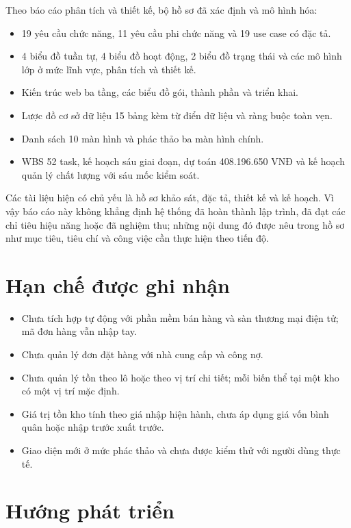 \documentclass[12pt,a4paper]{report}
\begin{document}
Theo báo cáo phân tích và thiết kế, bộ hồ sơ đã xác định và mô hình hóa:
\begin{itemize}
\item 19 yêu cầu chức năng, 11 yêu cầu phi chức năng và 19 use case có đặc tả.
\item 4 biểu đồ tuần tự, 4 biểu đồ hoạt động, 2 biểu đồ trạng thái và các mô hình lớp ở mức lĩnh vực, phân tích và thiết kế.
\item Kiến trúc web ba tầng, các biểu đồ gói, thành phần và triển khai.
\item Lược đồ cơ sở dữ liệu 15 bảng kèm từ điển dữ liệu và ràng buộc toàn vẹn.
\item Danh sách 10 màn hình và phác thảo ba màn hình chính.
\item WBS 52 task, kế hoạch sáu giai đoạn, dự toán 408.196.650 VNĐ và kế hoạch quản lý chất lượng với sáu mốc kiểm soát.
\end{itemize}

Các tài liệu hiện có chủ yếu là hồ sơ khảo sát, đặc tả, thiết kế và kế hoạch. Vì vậy báo cáo này không khẳng định hệ thống đã hoàn thành lập trình, đã đạt các chỉ tiêu hiệu năng hoặc đã nghiệm thu; những nội dung đó được nêu trong hồ sơ như mục tiêu, tiêu chí và công việc cần thực hiện theo tiến độ.

\section{Hạn chế được ghi nhận}

\begin{itemize}
\item Chưa tích hợp tự động với phần mềm bán hàng và sàn thương mại điện tử; mã đơn hàng vẫn nhập tay.
\item Chưa quản lý đơn đặt hàng với nhà cung cấp và công nợ.
\item Chưa quản lý tồn theo lô hoặc theo vị trí chi tiết; mỗi biến thể tại một kho có một vị trí mặc định.
\item Giá trị tồn kho tính theo giá nhập hiện hành, chưa áp dụng giá vốn bình quân hoặc nhập trước xuất trước.
\item Giao diện mới ở mức phác thảo và chưa được kiểm thử với người dùng thực tế.
\end{itemize}

\section{Hướng phát triển}
\end{document}
